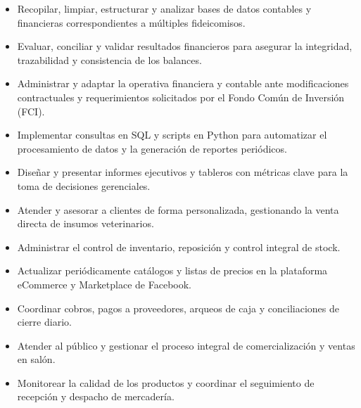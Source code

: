 \documentclass{CV_template}
\begin{document}
\begin{itemize}
    \item Recopilar, limpiar, estructurar y analizar bases de datos contables y financieras correspondientes a múltiples fideicomisos.
    \item Evaluar, conciliar y validar resultados financieros para asegurar la integridad, trazabilidad y consistencia de los balances.
    \item Administrar y adaptar la operativa financiera y contable ante modificaciones contractuales y requerimientos solicitados por el Fondo Común de Inversión (FCI).
    \item Implementar consultas en SQL y scripts en Python para automatizar el procesamiento de datos y la generación de reportes periódicos.
    \item Diseñar y presentar informes ejecutivos y tableros con métricas clave para la toma de decisiones gerenciales.
\end{itemize}

\begin{itemize}
    \item Atender y asesorar a clientes de forma personalizada, gestionando la venta directa de insumos veterinarios.
    \item Administrar el control de inventario, reposición y control integral de stock.
    \item Actualizar periódicamente catálogos y listas de precios en la plataforma eCommerce y Marketplace de Facebook.
    \item Coordinar cobros, pagos a proveedores, arqueos de caja y conciliaciones de cierre diario.
\end{itemize}

\begin{itemize}
    \item Atender al público y gestionar el proceso integral de comercialización y ventas en salón.
    \item Monitorear la calidad de los productos y coordinar el seguimiento de recepción y despacho de mercadería.
\end{itemize}
\end{document}
